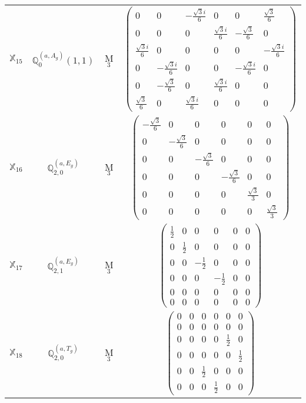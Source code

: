 \documentclass[fleqn,10pt,landscape]{article}
\begin{document}
\begin{itemize}
\begin{center}
\begin{longtable}{c|c|c|c}
$ \mathbb{X}_{15} $ & $\mathbb{Q}_{0}^{(a,A_{g})}(1,1)$ & M$_{3}$ & $\begin{pmatrix} 0 & 0 & - \frac{\sqrt{3} i}{6} & 0 & 0 & \frac{\sqrt{3}}{6} \\ 0 & 0 & 0 & \frac{\sqrt{3} i}{6} & - \frac{\sqrt{3}}{6} & 0 \\ \frac{\sqrt{3} i}{6} & 0 & 0 & 0 & 0 & - \frac{\sqrt{3} i}{6} \\ 0 & - \frac{\sqrt{3} i}{6} & 0 & 0 & - \frac{\sqrt{3} i}{6} & 0 \\ 0 & - \frac{\sqrt{3}}{6} & 0 & \frac{\sqrt{3} i}{6} & 0 & 0 \\ \frac{\sqrt{3}}{6} & 0 & \frac{\sqrt{3} i}{6} & 0 & 0 & 0 \end{pmatrix}$ \\
$ \mathbb{X}_{16} $ & $\mathbb{Q}_{2,0}^{(a,E_{g})}$ & M$_{3}$ & $\begin{pmatrix} - \frac{\sqrt{3}}{6} & 0 & 0 & 0 & 0 & 0 \\ 0 & - \frac{\sqrt{3}}{6} & 0 & 0 & 0 & 0 \\ 0 & 0 & - \frac{\sqrt{3}}{6} & 0 & 0 & 0 \\ 0 & 0 & 0 & - \frac{\sqrt{3}}{6} & 0 & 0 \\ 0 & 0 & 0 & 0 & \frac{\sqrt{3}}{3} & 0 \\ 0 & 0 & 0 & 0 & 0 & \frac{\sqrt{3}}{3} \end{pmatrix}$ \\
$ \mathbb{X}_{17} $ & $\mathbb{Q}_{2,1}^{(a,E_{g})}$ & M$_{3}$ & $\begin{pmatrix} \frac{1}{2} & 0 & 0 & 0 & 0 & 0 \\ 0 & \frac{1}{2} & 0 & 0 & 0 & 0 \\ 0 & 0 & - \frac{1}{2} & 0 & 0 & 0 \\ 0 & 0 & 0 & - \frac{1}{2} & 0 & 0 \\ 0 & 0 & 0 & 0 & 0 & 0 \\ 0 & 0 & 0 & 0 & 0 & 0 \end{pmatrix}$ \\
$ \mathbb{X}_{18} $ & $\mathbb{Q}_{2,0}^{(a,T_{g})}$ & M$_{3}$ & $\begin{pmatrix} 0 & 0 & 0 & 0 & 0 & 0 \\ 0 & 0 & 0 & 0 & 0 & 0 \\ 0 & 0 & 0 & 0 & \frac{1}{2} & 0 \\ 0 & 0 & 0 & 0 & 0 & \frac{1}{2} \\ 0 & 0 & \frac{1}{2} & 0 & 0 & 0 \\ 0 & 0 & 0 & \frac{1}{2} & 0 & 0 \end{pmatrix}$ \\

\end{longtable}
\end{center}
\end{itemize}
\end{document}

